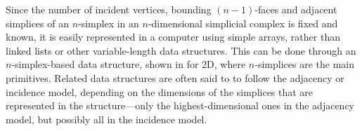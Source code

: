 Since the number of incident vertices, bounding $(n-1)$-faces and adjacent simplices of an $n$-simplex in an $n$-dimensional simplicial complex is fixed and known, it is easily represented in a computer using simple arrays, rather than linked lists or other variable-length data structures.
This can be done through an $n$-simplex-based data structure, shown in  for 2D, where $n$-simplices are the main primitives.
Related data structures are often said to to follow the adjacency or incidence model, depending on the dimensions of the simplices that are represented in the structure---only the highest-dimensional ones in the adjacency model, but possibly all in the incidence model.
\begin{figure}[tbp]
\centering
{}
\quad
{}

\end{figure}
